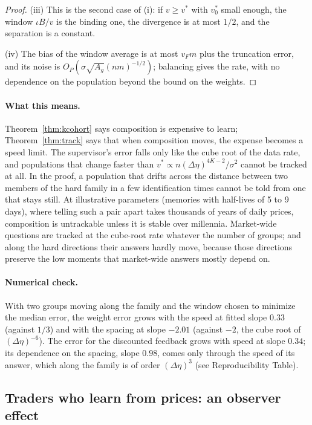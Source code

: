\documentclass[12pt]{article}
\theoremstyle{definition}
\theoremstyle{remark}
\begin{document}
\begin{proof}
(iii) This is the second case of (i): if $v\ge v^*$ with $v^*_0$ small enough, the window $\iota B/v$ is the binding one, the divergence is at most $1/2$, and the separation is a constant.

(iv) The bias of the window average is at most $v_Fm$ plus the truncation error, and its noise is $O_P(\sigma\sqrt{A_g}(nm)^{-1/2})$; balancing gives the rate, with no dependence on the population beyond the bound on the weights.
\end{proof}

\paragraph{What this means.} Theorem~\ref{thm:kcohort} says composition is expensive to learn; Theorem~\ref{thm:track} says that when composition moves, the expense becomes a speed limit. The supervisor's error falls only like the cube root of the data rate, and populations that change faster than $v^*\propto n(\Delta\eta)^{4K-2}/\sigma^2$ cannot be tracked at all. In the proof, a population that drifts across the distance between two members of the hard family in a few identification times cannot be told from one that stays still. At illustrative parameters (memories with half-lives of 5 to 9 days), where telling such a pair apart takes thousands of years of daily prices, composition is untrackable unless it is stable over millennia. Market-wide questions are tracked at the cube-root rate whatever the number of groups; and along the hard directions their answers hardly move, because those directions preserve the low moments that market-wide answers mostly depend on.

\paragraph{Numerical check.} With two groups moving along the family and the window chosen to minimize the median error, the weight error grows with the speed at fitted slope $0.33$ (against $1/3$) and with the spacing at slope $-2.01$ (against $-2$, the cube root of $(\Delta\eta)^{-6}$). The error for the discounted feedback grows with speed at slope $0.34$; its dependence on the spacing, slope $0.98$, comes only through the speed of its answer, which along the family is of order $(\Delta\eta)^3$ (see Reproducibility Table).

\subsection{Traders who learn from prices: an observer effect}
\end{document}
